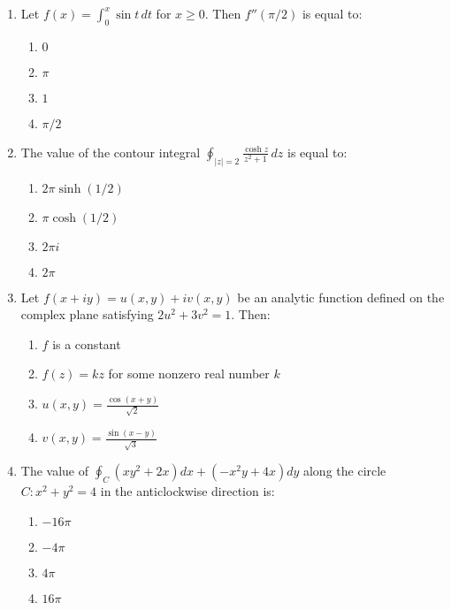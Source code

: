 \documentclass[journal,12pt,onecolumn]{IEEEtran}
\theoremstyle{remark}
\begin{document}
\begin{enumerate}
\item Let $f(x) = \int_0^x \sin t \, dt$ for $x \geq 0$. Then $f''(\pi/2)$ is equal to:
\begin{enumerate}
    \item $0$
    \item $\pi$
    \item $1$
    \item $\pi/2$
\end{enumerate}

\item The value of the contour integral $\oint_{|z|=2} \frac{\cosh z}{z^2 + 1} \, dz$ is equal to:
\begin{enumerate}
    \item $2\pi \sinh (1/2)$
    \item $\pi \cosh (1/2)$
    \item $2\pi i$
    \item $2\pi$
\end{enumerate}
\item Let $f(x+iy) = u(x,y) + iv(x,y)$ be an analytic function defined on the complex plane satisfying $2u^2 + 3v^2 = 1$. Then:
\begin{enumerate}
    \item $f$ is a constant
    \item $f(z) = kz$ for some nonzero real number $k$
    \item $u(x,y) = \frac{\cos(x+y)}{\sqrt{2}}$
    \item $v(x,y) = \frac{\sin(x-y)}{\sqrt{3}}$
\end{enumerate}

\item The value of $\oint_C (xy^2 + 2x) dx + (-x^2 y + 4x) dy$ along the circle $C: x^2 + y^2 = 4$ in the anticlockwise direction is:
\begin{enumerate}
    \item $-16\pi$
    \item $-4\pi$
    \item $4\pi$
    \item $16\pi$
\end{enumerate}

    
    





\end{enumerate}
\end{document}
